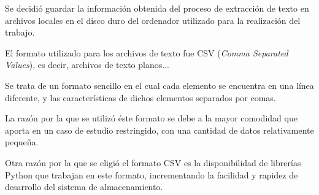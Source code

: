 Se decidió guardar la información obtenida del proceso de extracción de texto en archivos locales en el disco duro del ordenador utilizado para la realización del trabajo.

El formato utilizado para los archivos de texto fue CSV (\textit{Comma Separated Values}), es decir, archivos de texto planos...

Se trata de un formato sencillo en el cual cada elemento se encuentra en una línea diferente, y las características de dichos elementos separados por comas.

La razón por la que se utilizó éste formato se debe a la mayor comodidad que aporta en un caso de estudio restringido, con una cantidad de datos relativamente pequeña.

Otra razón por la que se eligió el formato CSV es la disponibilidad de librerías Python que trabajan en este formato, incrementando la facilidad y rapidez de desarrollo del sistema de almacenamiento.